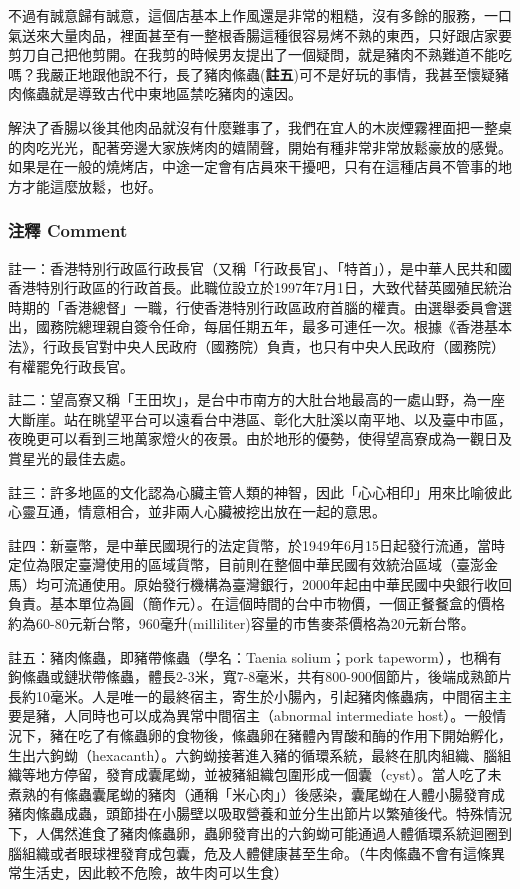 \documentclass[
]{article}
\begin{document}
\begin{enumerate}
  不過有誠意歸有誠意，這個店基本上作風還是非常的粗糙，沒有多餘的服務，一口氣送來大量肉品，裡面甚至有一整根香腸這種很容易烤不熟的東西，只好跟店家要剪刀自己把他剪開。在我剪的時候男友提出了一個疑問，就是豬肉不熟難道不能吃嗎？我嚴正地跟他說不行，長了豬肉絛蟲(\textbf{註五})可不是好玩的事情，我甚至懷疑豬肉絛蟲就是導致古代中東地區禁吃豬肉的遠因。

  解決了香腸以後其他肉品就沒有什麼難事了，我們在宜人的木炭煙霧裡面把一整桌的肉吃光光，配著旁邊大家族烤肉的嬉鬧聲，開始有種非常非常放鬆豪放的感覺。如果是在一般的燒烤店，中途一定會有店員來干擾吧，只有在這種店員不管事的地方才能這麼放鬆，也好。
\end{enumerate}

\hypertarget{ux6ce8ux91cb-comment}{%
\subsubsection{注釋 Comment}\label{ux6ce8ux91cb-comment}}

註一：香港特別行政區行政長官（又稱「行政長官」、「特首」），是中華人民共和國香港特別行政區的行政首長。此職位設立於1997年7月1日，大致代替英國殖民統治時期的「香港總督」一職，行使香港特別行政區政府首腦的權責。由選舉委員會選出，國務院總理親自簽令任命，每屆任期五年，最多可連任一次。根據《香港基本法》，行政長官對中央人民政府（國務院）負責，也只有中央人民政府（國務院）有權罷免行政長官。

註二：望高寮又稱「王田坎」，是台中市南方的大肚台地最高的一處山野，為一座大斷崖。站在眺望平台可以遠看台中港區、彰化大肚溪以南平地、以及臺中市區，夜晚更可以看到三地萬家燈火的夜景。由於地形的優勢，使得望高寮成為一觀日及賞星光的最佳去處。

註三：許多地區的文化認為心臟主管人類的神智，因此「心心相印」用來比喻彼此心靈互通，情意相合，並非兩人心臟被挖出放在一起的意思。

註四：新臺幣，是中華民國現行的法定貨幣，於1949年6月15日起發行流通，當時定位為限定臺灣使用的區域貨幣，目前則在整個中華民國有效統治區域（臺澎金馬）均可流通使用。原始發行機構為臺灣銀行，2000年起由中華民國中央銀行收回負責。基本單位為圓（簡作元）。在這個時間的台中市物價，一個正餐餐盒的價格約為60-80元新台幣，960毫升(milliliter)容量的市售麥茶價格為20元新台幣。

註五：豬肉絛蟲，即豬帶絛蟲（學名：Taenia solium；pork
tapeworm），也稱有鉤絛蟲或鏈狀帶絛蟲，體長2-3米，寬7-8毫米，共有800-900個節片，後端成熟節片長約10毫米。人是唯一的最終宿主，寄生於小腸內，引起豬肉絛蟲病，中間宿主主要是豬，人同時也可以成為異常中間宿主（abnormal
intermediate
host）。一般情況下，豬在吃了有絛蟲卵的食物後，絛蟲卵在豬體內胃酸和酶的作用下開始孵化，生出六鉤蚴（hexacanth）。六鉤蚴接著進入豬的循環系統，最終在肌肉組織、腦組織等地方停留，發育成囊尾蚴，並被豬組織包圍形成一個囊（cyst）。當人吃了未煮熟的有絛蟲囊尾蚴的豬肉（通稱「米心肉」）後感染，囊尾蚴在人體小腸發育成豬肉絛蟲成蟲，頭節掛在小腸壁以吸取營養和並分生出節片以繁殖後代。特殊情況下，人偶然進食了豬肉絛蟲卵，蟲卵發育出的六鉤蚴可能通過人體循環系統迴圈到腦組織或者眼球裡發育成包囊，危及人體健康甚至生命。（牛肉絛蟲不會有這條異常生活史，因此較不危險，故牛肉可以生食）
\end{document}
